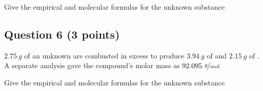 \documentclass[12pt, letterpaper]{memoir}
\begin{document}
	\noindent Give the empirical and molecular formulas for the unknown substance

	\vspace{17em}
	\subsection*{Question 6 (3 points)}
	$2.75~g$ of an unknown are combusted in excess  to produce $3.94~g$ of  and $2.15~g$ of . A separate analysis gave the compound's molar mass as $92.095~\nicefrac{g}{mol}$
	
	\noindent Give the empirical and molecular formulas for the unknown substance
\end{document}
